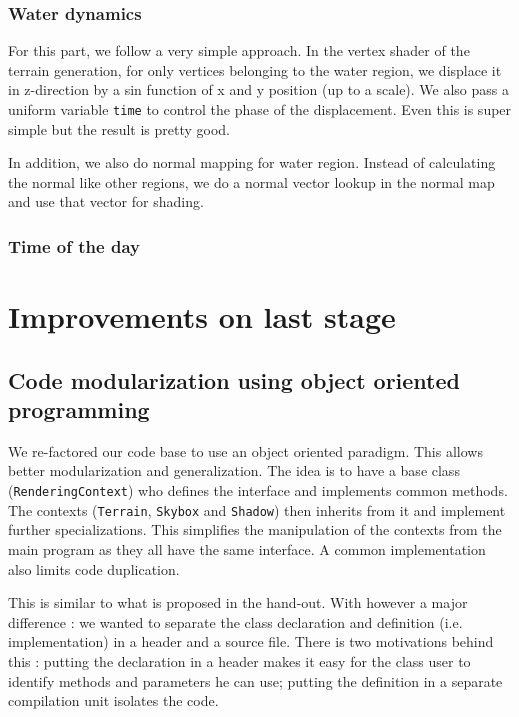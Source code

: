 \documentclass[a4paper,11pt]{article}
\begin{document}
\subsubsection{Water dynamics}

For this part, we follow a very simple approach. In the vertex shader of the terrain generation, for only vertices belonging to the water region, we displace it in z-direction by a sin function of x and y position (up to a scale). We also pass a uniform variable \texttt{time} to control the phase of the displacement. Even this is super simple but the result is pretty good. 

In addition, we also do normal mapping for water region. Instead of calculating the normal like other regions, we do a normal vector lookup in the normal map and use that vector for shading. 

\subsubsection{Time of the day}


\section{Improvements on last stage}

\subsection{Code modularization using object oriented programming}
\label{OO}

We re-factored our code base to use an object oriented paradigm. This allows better modularization and generalization. The idea is to have a base class (\texttt{RenderingContext}) who defines the interface and implements common methods. The contexts (\texttt{Terrain}, \texttt{Skybox} and \texttt{Shadow}) then inherits from it and implement further specializations. This simplifies the manipulation of the contexts from the main program as they all have the same interface. A common implementation also limits code duplication.

This is similar to what is proposed in the hand-out. With however a major difference : we wanted to separate the class declaration and definition (i.e. implementation) in a header and a source file. There is two motivations behind this : putting the declaration in a header makes it easy for the class user to identify methods and parameters he can use; putting the definition in a separate compilation unit isolates the code.
\end{document}
